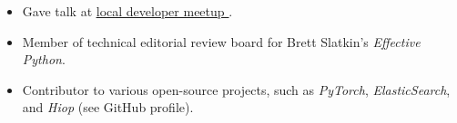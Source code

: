 \documentclass{mycv}
\begin{document}
\begin{itemize}
  \item Gave talk at \href{https://fullstacktc.org/user/ashermancinelli}{ \underline{ local developer meetup } }. 
  \item Member of technical editorial review board for Brett Slatkin's \textit{Effective Python}. 
  \item Contributor to various open-source projects, such as \textit{PyTorch}, \textit{ElasticSearch}, and \textit{Hiop} (see GitHub profile).
\end{itemize}
% 

%
\end{document}
